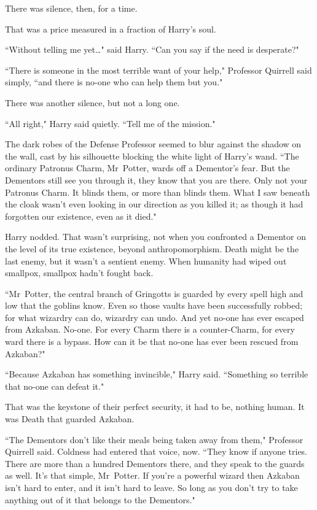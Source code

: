 There was silence, then, for a time.

That was a price measured in a fraction of Harry's soul.

``Without telling me yet{\ldots}" said Harry. ``Can you say if the need is desperate?"

``There is someone in the most terrible want of your help," Professor Quirrell said simply, ``and there is no-one who can help them but you."

There was another silence, but not a long one.

``All right," Harry said quietly. ``Tell me of the mission."

The dark robes of the Defense Professor seemed to blur against the shadow on the wall, cast by his silhouette blocking the white light of Harry's wand. ``The ordinary Patronus Charm, Mr~Potter, wards off a Dementor's fear. But the Dementors still see you through it, they know that you are there. Only not your Patronus Charm. It blinds them, or more than blinds them. What I saw beneath the cloak wasn't even looking in our direction as you killed it; as though it had forgotten our existence, even as it died."

Harry nodded. That wasn't surprising, not when you confronted a Dementor on the level of its true existence, beyond anthropomorphism. Death might be the last enemy, but it wasn't a sentient enemy. When humanity had wiped out smallpox, smallpox hadn't fought back.

``Mr~Potter, the central branch of Gringotts is guarded by every spell high and low that the goblins know. Even so those vaults have been successfully robbed; for what wizardry can do, wizardry can undo. And yet no-one has ever escaped from Azkaban. No-one. For every Charm there is a counter-Charm, for every ward there is a bypass. How can it be that no-one has ever been rescued from Azkaban?"

``Because Azkaban has something invincible," Harry said. ``Something so terrible that no-one can defeat it."

That was the keystone of their perfect security, it had to be, nothing human. It was Death that guarded Azkaban.

``The Dementors don't like their meals being taken away from them," Professor Quirrell said. Coldness had entered that voice, now. ``They know if anyone tries. There are more than a hundred Dementors there, and they speak to the guards as well. It's that simple, Mr~Potter. If you're a powerful wizard then Azkaban isn't hard to enter, and it isn't hard to leave. So long as you don't try to take anything out of it that belongs to the Dementors."

